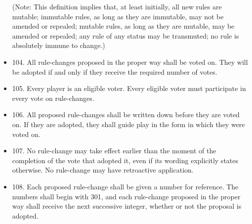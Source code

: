 \documentclass[11pt]{article}
\begin{document}
\begin{itemize}
     (Note: This definition implies that, at least initially, all new
     rules are mutable; immutable rules, as long as they are
     immutable, may not be amended or repealed; mutable rules, as long
     as they are mutable, may be amended or repealed; any rule of any
     status may be transmuted; no rule is absolutely immune to
     change.)
\item 104. All rule-changes proposed in the proper way shall be voted
     on. They will be adopted if and only if they receive the required
     number of votes.
\item 105. Every player is an eligible voter. Every eligible voter must
     participate in every vote on rule-changes.
\item 106. All proposed rule-changes shall be written down before they
     are voted on. If they are adopted, they shall guide play in the
     form in which they were voted on.
\item 107. No rule-change may take effect earlier than the moment of
     the completion of the vote that adopted it, even if its wording
     explicitly states otherwise. No rule-change may have retroactive
     application.
\item 108. Each proposed rule-change shall be given a number for
     reference. The numbers shall begin with 301, and each rule-change
     proposed in the proper way shall receive the next successive
     integer, whether or not the proposal is adopted.


\end{itemize}
\end{document}
